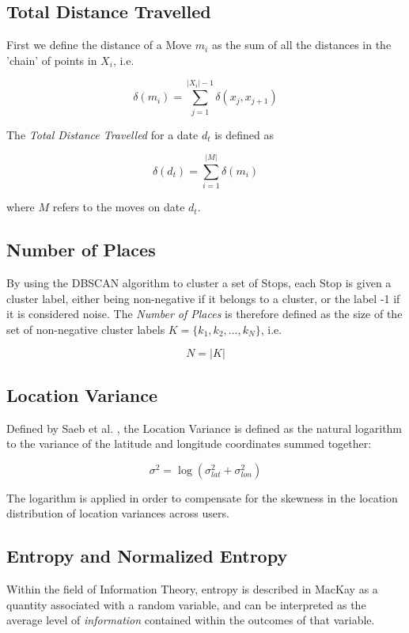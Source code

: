 \subsection{Total Distance Travelled}
First we define the distance of a Move $m_i$ as the sum of all the distances in the 'chain' of points in $X_i$, i.e.

\begin{equation}
\label{eq:feature-move-computation}
\delta (m_i)  = \sum_{j=1}^{|X_i|-1} \delta (x_j, x_{j+1})
\end{equation}

The \textit{Total Distance Travelled} for a date $d_t$ is defined as 

\begin{equation}
\label{eq:feature-total-distance}
\delta (d_t) = \sum_{i=1}^{|M|} \delta (m_i)
\end{equation}

where $M$ refers to the moves on date $d_t$.

\subsection{Number of Places}
By using the DBSCAN algorithm to cluster a set of Stops, each Stop is given a cluster label, either being non-negative if it belongs to a cluster, or the label -1 if it is considered noise. The \textit{Number of Places} is therefore defined as the size of the set of non-negative cluster labels $K = \{k_1, k_2, ..., k_N\}$, i.e.

\begin{equation}
\label{eq:feature-num-places}
N = |K|
\end{equation}

\subsection{Location Variance}
Defined by Saeb et al. \cite{Saeb2015}, the Location Variance is defined as the natural logarithm to the variance of the latitude and longitude coordinates summed together: 

\begin{equation}
\label{eq:feature-log-var}
\sigma^2 = \log (\sigma_{lat}^2 + \sigma_{lon}^2)
\end{equation}

The logarithm is applied in order to compensate for the skewness in the location distribution of location variances across users.

\subsection{Entropy and Normalized Entropy}
Within the field of Information Theory, entropy is described in MacKay \cite{information-theory} as a quantity associated with a random variable, and can be interpreted as the average level of \textit{information} contained within the outcomes of that variable. 

